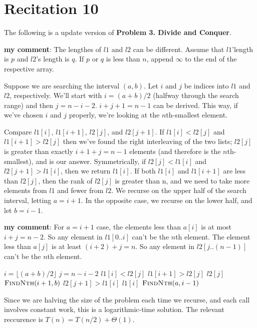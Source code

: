 \documentclass[12pt,twoside]{article}
\begin{document}
\section{Recitation 10}
The following is a update version of \textbf{Problem 3. Divide and Conquer}.

\textbf{my comment}: The lengthes of $l1$ and $l2$ can be different. Assume that
$l1$'length is $p$ and $l2$'s length is $q$. If $p$ or $q$ is less than $n$,
append $\infty$ to the end of the respective array.

Suppose we are searching the interval $(a, b)$. Let $i$ and $j$ be indices into
$l1$ and $l2$, respectively. We'll start with $i = (a + b)/2$ (halfway through
the search range) and then $j=n-i-2$. $i+j+1=n-1$ can be derived. This way, if we've chosen $i$ and
$j$ properly, we're looking at the $n$th-smallest element.

Compare $l1[i]$, $l1[i + 1]$, $l2[j]$, and $l2[j + 1]$. If $l1[i] < l2[j]$ and
$l1[i + 1] > l2[j]$ then we've
found the right interleaving of the two lists; $l2[j]$ is greater than exactly
$i + 1 + j  = n - 1$
elements (and therefore is the $n$th-smallest), and is our answer. Symmetrically,
if $l2[j] < l1[i]$ and
$l2[j + 1] > l1[i]$, then we return $l1[i]$.
If both $l1[i]$ and $l1[i + 1]$ are less than $l2[j]$, then the rank of $l2[j]$ is greater than n, and we need to
take more elements from $l1$ and fewer from $l2$. We recurse on the upper half of the search interval,
letting $a = i + 1$. In the opposite case, we recurse on the lower half, and let
$b = i - 1$.

\textbf{my comment}: For $a=i+1$ case, the elements less than $a[i]$ is at most
$i+j=n-2$. So any element in $l1[0..i]$ can't be the $n$th element. The element less than $a[j]$
is at least $(i+2)+j=n$. So any element in $l2[j..(n-1)]$ can't be the $n$th element.

\begin{codebox}
\li $i = \lfloor(a+b)/2\rfloor$
\li $j = n - i - 2$
\li \If $l1[i] < l2[j]$
\li \Then \If $l1[i+1] > l2[j]$
\li \Then \Return $l2[j]$
\li \Else \Return $\textnormal{\scshape FindNth}(i+1, b)$
\End
\li \Else \If $l2[j+1] > l1[i]$
\li \Then \Return $l1[i]$
\li \Else \Return $\textnormal{\scshape FindNth}(a, i-1)$
\End
\End
\end{codebox}

Since we are halving the size of the problem each time we recurse, and each call
involves constant work, this is a logarithmic-time solution. The relevant
reccurence is $T(n) = T (n/2) + Θ(1)$.
\end{document}
